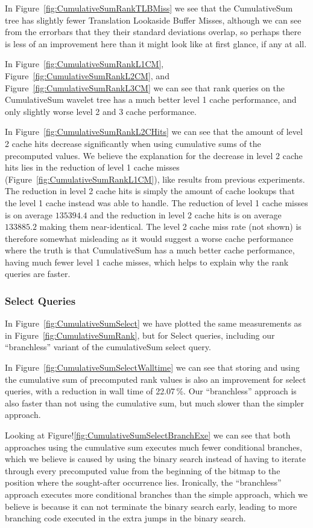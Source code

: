 In Figure~\ref{fig:CumulativeSumRankTLBMiss} we see that the CumulativeSum tree has slightly fewer Translation Lookaside Buffer Misses, although we can see from the errorbars that they their standard deviations overlap, so perhaps there is less of an improvement here than it might look like at first glance, if any at all.

In Figure~\ref{fig:CumulativeSumRankL1CM}, Figure~\ref{fig:CumulativeSumRankL2CM}, and Figure~\ref{fig:CumulativeSumRankL3CM} we can see that rank queries on the CumulativeSum wavelet tree has a much better level 1 cache performance, and only slightly worse level 2 and 3 cache performance.

In Figure~\ref{fig:CumulativeSumRankL2CHits} we can see that the amount of level 2 cache hits decrease significantly when using cumulative sums of the precomputed values.
We believe the explanation for the decrease in level 2 cache hits lies in the reduction of level 1 cache misses (Figure~\ref{fig:CumulativeSumRankL1CM}), like results from previous experiments.
The reduction in level 2 cache hits is simply the amount of cache lookups that the level 1 cache instead was able to handle.
The reduction of level 1 cache misses is on average $\num{135394.4}$ and the reduction in level 2 cache hits is on average $\num{133885.2}$ making them near-identical.
The level 2 cache miss rate (not shown) is therefore somewhat misleading as it would suggest a worse cache performance where the truth is that CumulativeSum has a much better cache performance, having much fewer level 1 cache misses, which helps to explain why the rank queries are faster.



\subsubsection{Select Queries}
\label{sec:cumulativeSumExperimentSelectQueries}
In Figure~\ref{fig:CumulativeSumSelect} we have plotted the same measurements as in Figure~\ref{fig:CumulativeSumRank}, but for Select queries, including our “branchless” variant of the cumulativeSum select query.

In Figure~\ref{fig:CumulativeSumSelectWalltime} we can see that storing and using the cumulative sum of precomputed rank values is also an improvement for select queries, with a reduction in wall time of 22.07\,\%.
Our “branchless” approach is also faster than not using the cumulative sum, but much slower than the simpler approach.

Looking at Figure!\ref{fig:CumulativeSumSelectBranchExe} we can see that both approaches using the cumulative sum executes much fewer conditional branches, which we believe is caused by using the binary search instead of having to iterate through every precomputed value from the beginning of the bitmap to the position where the sought-after occurrence lies.
Ironically, the “branchless” approach executes more conditional branches than the simple approach, which we believe is because it can not terminate the binary search early, leading to more branching code executed in the extra jumps in the binary search.

